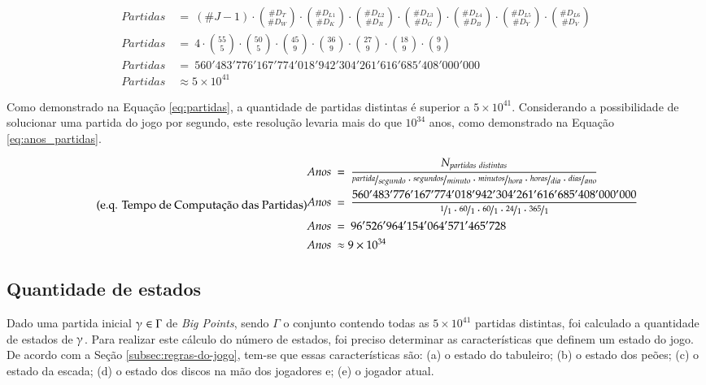  \begin{equation}
	 \label{eq:partidas}
	 \tag{e.q. Quantidades de Partidas Distintas}
 \begin{split}
 Partidas\ &=\  (\#J-1) \cdot \binom{\#D_T}{\#D_W} \cdot \binom{\#D_{L1}}{\#D_K} \cdot \binom{\#D_{L2}}{\#D_R} \cdot \binom{\#D_{L3}}{\#D_G} \cdot \binom{\#D_{L4}}{\#D_B} \cdot \binom{\#D_{L5}}{\#D_Y} \cdot \binom{\#D_{L6}}{\#D_V}\\
 Partidas\ &=\  4\cdot \binom{55}{5} \cdot \binom{50}{5} \cdot \binom{45}{9} \cdot \binom{36}{9} \cdot \binom{27}{9} \cdot \binom{18}{9} \cdot \binom{9}{9}\\
 Partidas\ &=\ 560'483'776'167'774'018'942'304'261'616'685'408'000'000\\
 Partidas\ &\approx 5\times 10^{41}
 \end{split}
 \end{equation}

Como demonstrado na Equação \ref{eq:partidas}, a quantidade de partidas distintas é superior a $5\times 10^{41}$. Considerando a possibilidade de solucionar uma partida do jogo por segundo, este resolução levaria mais do que $10^{34}$ anos, como demonstrado na Equação \ref{eq:anos_partidas}.

 \begin{equation} \label{eq:anos_partidas} \tag{e.q. Tempo de Computação das Partidas}
 \begin{split}
 Anos\ &=\ \dfrac{N_{partidas\ distintas}}{\nicefrac{partida}{segundo}\cdot\nicefrac{segundos}{minuto}\cdot\nicefrac{minutos}{hora}\cdot\nicefrac{horas}{dia}\cdot\nicefrac{dias}{ano}}\\
 Anos\ &=\ \dfrac{560'483'776'167'774'018'942'304'261'616'685'408'000'000}{\nicefrac{1}{1}\cdot\nicefrac{60}{1}\cdot\nicefrac{60}{1}\cdot\nicefrac{24}{1}\cdot\nicefrac{365}{1}}\\
 Anos\ &=\ 96'526'964'154'064'571'465'728\\
 Anos\ &\approx 9\times 10^{34}
 \end{split}
 \end{equation}

\subsection{Quantidade de estados}
\label{subsec:quantidade-de-estados}

Dado uma partida inicial $\gammaup \in \Gamma$ de \emph{Big Points}, sendo $\Gamma$ o conjunto contendo todas as $5\times 10^{41}$ partidas distintas, foi calculado a quantidade de estados de $\gammaup$. Para realizar este cálculo do número de estados, foi preciso determinar as características que definem um estado do jogo. De acordo com a Seção \ref{subsec:regras-do-jogo}, tem-se que essas características são: (a) o estado do tabuleiro; (b) o estado dos peões; (c) o estado da escada; (d) o estado dos discos na mão dos jogadores e; (e) o jogador atual.

